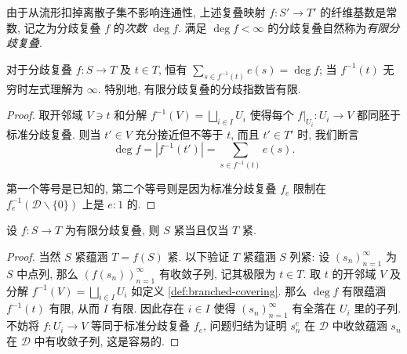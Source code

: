 \begin{definition}\label{def:ramified-covering-degree}
	由于从流形扣掉离散子集不影响连通性, 上述复叠映射 $f: S' \to T'$ 的纤维基数是常数, 记之为分歧复叠 $f$ 的\emph{次数} $\deg f$. 满足 $\deg f < \infty$ 的分歧复叠自然称为\emph{有限分歧复叠}.
\end{definition}

\begin{proposition}\label{prop:sum-ram-degree}
	对于分歧复叠 $f: S \to T$ 及 $t \in T$, 恒有 $\sum_{s \in f^{-1}(t)} e(s) = \deg f$; 当 $f^{-1}(t)$ 无穷时左式理解为 $\infty$. 特别地, 有限分歧复叠的分歧指数皆有限.
\end{proposition}
\begin{proof}
	取开邻域 $V \ni t$ 和分解 $f^{-1}(V) = \bigsqcup_{i \in I} U_i$ 使得每个 $f|_{U_i}: U_i \to V$ 都同胚于标准分歧复叠. 则当 $t' \in V$ 充分接近但不等于 $t$, 而且 $t' \in T'$ 时, 我们断言
	\[ \deg f = |f^{-1}(t')| = \sum_{s \in f^{-1}(t)} e(s). \]

	第一个等号是已知的, 第二个等号则是因为标准分歧复叠 $f_e$ 限制在 $f_e^{-1}(\mathcal{D} \smallsetminus \{0\})$ 上是 $e:1$ 的.
\end{proof}

\begin{proposition}\label{prop:branched-compactness}
	设 $f: S \to T$ 为有限分歧复叠, 则 $S$ 紧当且仅当 $T$ 紧.
\end{proposition}
\begin{proof}
	当然 $S$ 紧蕴涵 $T = f(S)$ 紧. 以下验证 $T$ 紧蕴涵 $S$ 列紧: 设 $(s_n)_{n=1}^\infty$ 为 $S$ 中点列, 那么 $(f(s_n))_{n=1}^\infty$ 有收敛子列, 记其极限为 $t \in T$. 取 $t$ 的开邻域 $V$ 及分解 $f^{-1}(V) = \bigsqcup_{i \in I} U_i$ 如定义 \ref{def:branched-covering}. 那么 $\deg f$ 有限蕴涵 $f^{-1}(t)$ 有限, 从而 $I$ 有限. 因此存在 $i \in I$ 使得 $(s_n)_{n=1}^\infty$ 有全落在 $U_i$ 里的子列. 不妨将 $f: U_i \to V$ 等同于标准分歧复叠 $f_e$, 问题归结为证明 $s_n^e$ 在 $\mathcal{D}$ 中收敛蕴涵 $s_n$ 在 $\mathcal{D}$ 中有收敛子列, 这是容易的.
\end{proof}

